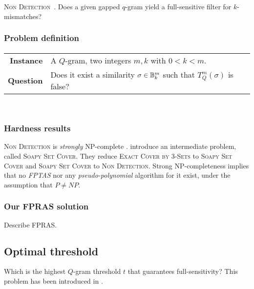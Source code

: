\textsc{Non Detection}~\citep{Nicolas2005}. Does a given gapped $q$-gram yield a full-sensitive filter for $k$-mismatches?

\subsubsection{Problem definition}

\paragraph{}
\begin{tabular}{rl}
{\bf Instance}	&	A $Q$-gram, two integers $m,k$ with $0 < k < m$. \\
{\bf Question}	&	Does it exist a similarity $\sigma \in \mathbb {B}^{m}_{k}$ such that $T_{Q}^{m}(\sigma)$ is false? \\
\end{tabular}
\\

\subsubsection{Hardness results}

\textsc{Non Detection} is \emph{strongly} NP-complete \citep{Nicolas2005}.
\citeauthor{Nicolas2005} introduce an intermediate problem, called \textsc{Soapy Set Cover}. They reduce \textsc{Exact Cover by 3-Sets} to \textsc{Soapy Set Cover} and \textsc{Soapy Set Cover} to \textsc{Non Detection}.
Strong NP-completeness implies that no \emph{FPTAS} nor any \emph{pseudo-polynomial} algorithm for it exist, under the assumption that $P \neq NP$.

\subsubsection{Our FPRAS solution}


Describe FPRAS.


\subsection{Optimal threshold}

Which is the highest $Q$-gram threshold $t$ that guarantees full-sensitivity?
This problem has been introduced in \citep{Burkhardt2001}. %

